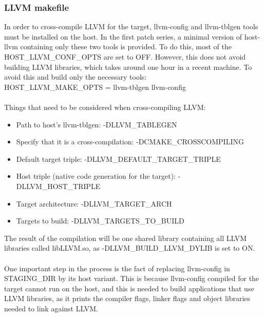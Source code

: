 \documentclass[12pt,a4paper,oneside]{article}
\begin{document}
\subsubsection*{LLVM makefile}
In order to cross-compile LLVM for the target, llvm-config and llvm-tblgen tools
must be installed on the host. In the first patch series, a minimal version of
host-llvm containing only these two tools is provided. To do this, most of the
{\selectfont HOST\_LLVM\_CONF\_OPTS} are set to OFF. However,
this does not avoid building LLVM libraries, which takes around one hour in a
recent machine. To avoid this and build only the necessary tools:\\
{\selectfont HOST\_LLVM\_MAKE\_OPTS = llvm-tblgen llvm-config}\\\\
Things that need to be considered when cross-compiling LLVM:
\begin{itemize}
  \item Path to host's llvm-tblgen: {\selectfont
  -DLLVM\_TABLEGEN}
  \item Specify that it is a cross-compilation: {\selectfont
  -DCMAKE\_CROSSCOMPILING}
  \item Default target triple: {\selectfont
  -DLLVM\_DEFAULT\_TARGET\_TRIPLE}
  \item Host triple (native code generation for the target): {\selectfont
  -DLLVM\_HOST\_TRIPLE}
  \item Target architecture: {\selectfont
  -DLLVM\_TARGET\_ARCH}
  \item Targets to build: {\selectfont
  -DLLVM\_TARGETS\_TO\_BUILD}
\end{itemize}
The result of the compilation will be one shared library containing all LLVM
libraries called libLLVM.so, as {\selectfont
-DLLVM\_BUILD\_LLVM\_DYLIB} is set to ON.\\\\
One important step in the process is the fact of replacing llvm-config in STAGING\_DIR
by its host variant. This is because llvm-config compiled for the target cannot
run on the host, and this is needed to build applications that use LLVM libraries,
as it prints the compiler flags, linker flags and object libraries needed to link
against LLVM.
\end{document}
